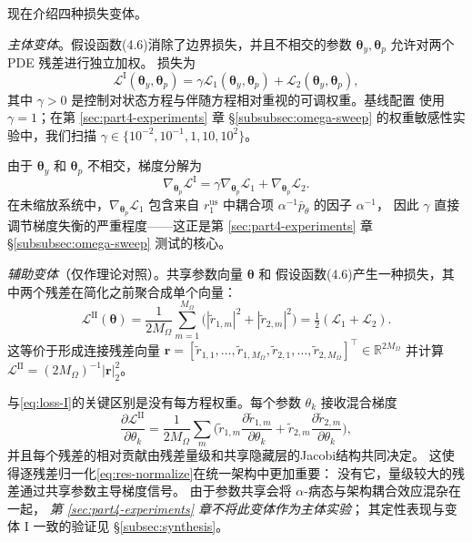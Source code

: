 \documentclass{xmu}
\theoremstyle{plain}
\theoremstyle{remark}
\begin{document}
现在介绍四种损失变体。

\label{subsubsec:variant-I}
\emph{主体变体}。假设函数(4.6)消除了边界损失，并且不相交的参数
$\boldsymbol{\theta}_y,\boldsymbol{\theta}_p$ 允许对两个 PDE 残差进行独立加权。
损失为
\begin{equation}
\boxed{\;\mathcal{L}^{\mathrm{I}}(\boldsymbol{\theta}_y,\boldsymbol{\theta}_p)
= \gamma\mathcal{L}_1(\boldsymbol{\theta}_y,\boldsymbol{\theta}_p)
+ \mathcal{L}_2(\boldsymbol{\theta}_y,\boldsymbol{\theta}_p),\;}
\label{eq:loss-I}
\end{equation}
其中 $\gamma>0$ 是控制对状态方程与伴随方程相对重视的可调权重。基线配置
使用 $\gamma=1$；在第 \ref{sec:part4-experiments} 章 §\ref{subsubsec:omega-sweep}
的权重敏感性实验中，我们扫描 $\gamma\in\{10^{-2},10^{-1},1,10,10^{2}\}$。

由于 $\boldsymbol{\theta}_y$ 和 $\boldsymbol{\theta}_p$ 不相交，梯度分解为
\begin{equation}
\nabla_{\boldsymbol{\theta}_p}\mathcal{L}^{\mathrm{I}}
= \gamma\nabla_{\boldsymbol{\theta}_p}\mathcal{L}_1
+ \nabla_{\boldsymbol{\theta}_p}\mathcal{L}_2.
\end{equation}
在未缩放系统中，$\nabla_{\boldsymbol{\theta}_p}\mathcal{L}_1$ 包含来自
$r_1^{\mathrm{us}}$ 中耦合项 $\alpha^{-1}\bar p_\theta$ 的因子 $\alpha^{-1}$，
因此 $\gamma$ 直接调节梯度失衡的严重程度——这正是第 \ref{sec:part4-experiments}
章 §\ref{subsubsec:omega-sweep} 测试的核心。

\label{subsubsec:variant-II}
\emph{辅助变体}（仅作理论对照）。共享参数向量 $\boldsymbol{\theta}$ 和
假设函数(4.6)产生一种损失，其中两个残差在简化之前聚合成单个向量：
\begin{equation}
\boxed{\;\mathcal{L}^{\mathrm{II}}(\boldsymbol{\theta})
= \frac{1}{2M_\Omega}\sum_{m=1}^{M_\Omega}\bigl(|\tilde r_{1,m}|^2+|\tilde r_{2,m}|^2\bigr)
= \tfrac{1}{2}(\mathcal{L}_1+\mathcal{L}_2).\;}
\label{eq:loss-II}
\end{equation}
这等价于形成连接残差向量
$\mathbf{r}=[\tilde r_{1,1},\ldots,\tilde r_{1,M_\Omega},\tilde r_{2,1},\ldots,\tilde r_{2,M_\Omega}]^\top\in\mathbb{R}^{2M_\Omega}$
并计算 $\mathcal{L}^{\mathrm{II}}=(2M_\Omega)^{-1}|\mathbf{r}|_2^2$。

与\eqref{eq:loss-I}的关键区别是没有每方程权重。每个参数 $\theta_k$ 接收混合梯度
\begin{equation}
\frac{\partial\mathcal{L}^{\mathrm{II}}}{\partial\theta_k}
= \frac{1}{2M_\Omega}\sum_{m}
\biggl(\tilde r_{1,m}\frac{\partial\tilde r_{1,m}}{\partial\theta_k}
+\tilde r_{2,m}\frac{\partial\tilde r_{2,m}}{\partial\theta_k}\biggr),
\end{equation}
并且每个残差的相对贡献由残差量级和共享隐藏层的Jacobi结构共同决定。
这使得逐残差归一化\eqref{eq:res-normalize}在统一架构中更加重要：
没有它，量级较大的残差通过共享参数主导梯度信号。
由于参数共享会将 $\alpha$-病态与架构耦合效应混杂在一起，
\emph{第 \ref{sec:part4-experiments} 章不将此变体作为主体实验}；
其定性表现与变体 I 一致的验证见 §\ref{subsec:synthesis}。
\end{document}
